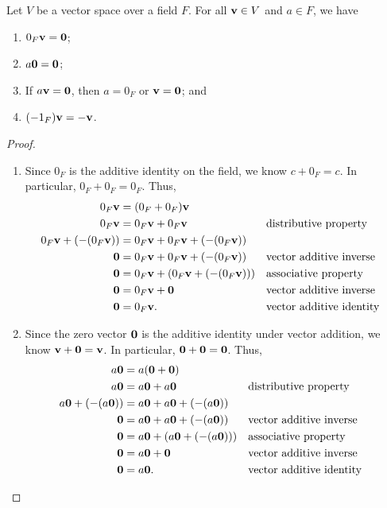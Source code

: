 \begin{thm}\label{thm:vectprop}
Let $ V $ be a vector space over a field $ F $. For all $ \mathbf{v}\in V $ and $ a\in F $, we have
\begin{enumerate}
    \item\label{thm:vectprop1} $ 0_F\mathbf{v}=\mathbf{0} $;
    \item\label{thm:vectprop2} $ a\mathbf{0}=\mathbf{0} $;
    \item\label{thm:vectprop3} If $ a\mathbf{v}=\mathbf{0} $, then $ a=0_F $ or $ \mathbf{v}=\mathbf{0} $; and
    \item\label{thm:vectprop4} $ (-1_F)\mathbf{v}=-\mathbf{v} $.
\end{enumerate}
\end{thm}
\begin{proof}~
\begin{enumerate}
    \item Since $ 0_F $ is the additive identity on the field, we know $ c+0_F=c $. In particular, $ 0_F+0_F=0_F $. Thus,
    \begin{align*}
        0_F\mathbf{v} &= (0_F+0_F)\mathbf{v} \\
        0_F\mathbf{v} &= 0_F\mathbf{v}+0_F\mathbf{v} && \text{distributive property} \\
        0_F\mathbf{v}+(-(0_F\mathbf{v})) &= 0_F\mathbf{v}+0_F\mathbf{v}+(-(0_F\mathbf{v})) \\
        \mathbf{0} &= 0_F\mathbf{v}+0_F\mathbf{v}+(-(0_F\mathbf{v})) && \text{vector additive inverse} \\
        \mathbf{0} &= 0_F\mathbf{v}+(0_F\mathbf{v}+(-(0_F\mathbf{v}))) && \text{associative property} \\
        \mathbf{0} &= 0_F\mathbf{v}+\mathbf{0} && \text{vector additive inverse} \\
        \mathbf{0} &= 0_F\mathbf{v}. && \text{vector additive identity}
    \end{align*}

    \item Since the zero vector $ \mathbf{0} $ is the additive identity under vector addition, we know $ \mathbf{v}+\mathbf{0}=\mathbf{v} $. In particular, $ \mathbf{0}+\mathbf{0}=\mathbf{0} $. Thus,
    \begin{align*}
        a\mathbf{0} &= a(\mathbf{0}+\mathbf{0}) \\
        a\mathbf{0} &= a\mathbf{0}+a\mathbf{0} && \text{distributive property} \\
        a\mathbf{0}+(-(a\mathbf{0})) &= a\mathbf{0}+a\mathbf{0}+(-(a\mathbf{0})) \\
        \mathbf{0} &= a\mathbf{0}+a\mathbf{0}+(-(a\mathbf{0})) && \text{vector additive inverse} \\
        \mathbf{0} &= a\mathbf{0}+(a\mathbf{0}+(-(a\mathbf{0}))) && \text{associative property} \\
        \mathbf{0} &= a\mathbf{0}+\mathbf{0} && \text{vector additive inverse} \\
        \mathbf{0} &= a\mathbf{0}. && \text{vector additive identity}
    \end{align*}


\end{enumerate}
\end{proof}
